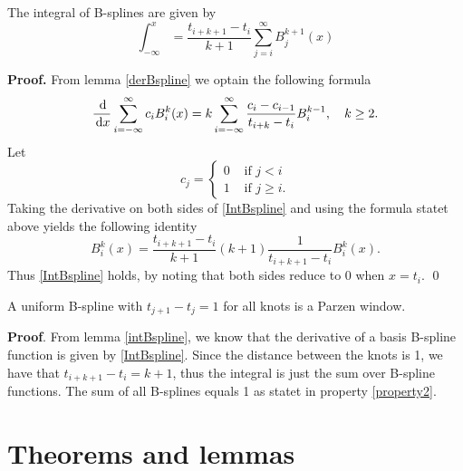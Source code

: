 \begin{lemma}\label{intBspline}
The integral of B-splines are given by
\begin{equation}
\int_{-\infty}^x = \frac{t_{i+k+1}-t_i}{k+1} \sum_{j=i}^\infty B_j^{k+1}(x)
\end{equation}
\end{lemma}
\textbf{Proof.} From lemma \ref{derBspline} we optain the following formula
\begin{equation}
  \frac{\df}{\df x} \sum_{i=-\infty}^\infty c_i B_i^k(x) = k\sum_{i=-\infty}^\infty \frac{c_i-c_{i-1}}{t_{i+k}-t_i}B_i^{k-1}, \quad k\geq 2.\label{IntBspline}
\end{equation}
Let 
\[
  c_j = \begin{cases}0 & \mbox{ if } j<i\\ 1 & \mbox{ if } j\geq i.\end{cases}
\]
Taking the derivative on both sides of \eqref{IntBspline} and using the formula statet above yields the following identity
\begin{equation}
B_i^k(x) = \frac{t_{i+k+1}-t_{i}}{k+1}(k+1)\frac{1}{t_{i+k+1}-t_{i}}B_i^k(x).
\end{equation}
Thus \eqref{IntBspline} holds, by noting that both sides reduce to 0 when $x = t_i$. \hfill\qed\\

\begin{proposition}\label{PWBspline}
A uniform B-spline with $t_{j+1}-t_j = 1$ for all knots is a Parzen window.
\end{proposition}
\textbf{Proof}. From lemma \ref{intBspline}, we know that the derivative of a basis B-spline function is given by \eqref{IntBspline}. Since the distance between the knots is 1, we have that $t_{i+k+1}-t_i = k+1$, thus the integral is just the sum over B-spline functions. The sum of all B-splines equals 1 as statet in property \ref{property2}.\\

\section{Theorems and lemmas}

